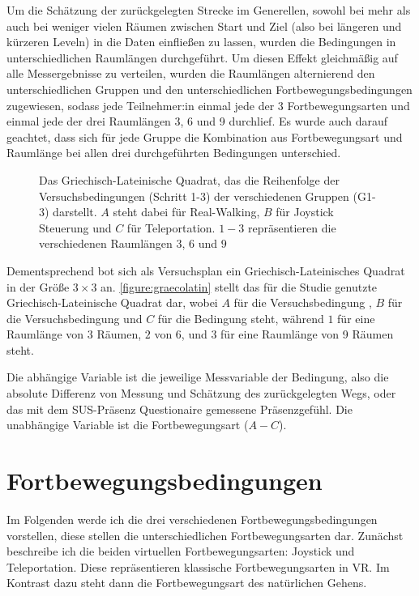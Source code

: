     Um die Schätzung der zurückgelegten Strecke im Generellen, sowohl bei mehr als auch bei weniger vielen Räumen zwischen Start und Ziel (also bei längeren und kürzeren Leveln) in die Daten einfließen zu lassen, wurden die Bedingungen in unterschiedlichen Raumlängen durchgeführt. Um diesen Effekt gleichmäßig auf alle Messergebnisse zu verteilen, wurden die Raumlängen alternierend den unterschiedlichen Gruppen und den unterschiedlichen Fortbewegungsbedingungen zugewiesen, sodass jede Teilnehmer:in einmal jede der 3 Fortbewegungsarten und einmal jede der drei Raumlängen 3, 6 und 9 durchlief. Es wurde auch darauf geachtet, dass sich für jede Gruppe die Kombination aus Fortbewegungsart und Raumlänge bei allen drei durchgeführten Bedingungen unterschied.

    \begin{figure}[!h]
        \centering
        

        \caption{Das Griechisch-Lateinische Quadrat, das die Reihenfolge der Versuchsbedingungen (Schritt 1-3) der verschiedenen Gruppen (G1-3) darstellt. $A$ steht dabei für Real-Walking, $B$ für Joystick Steuerung und $C$ für Teleportation. $1-3$ repräsentieren die verschiedenen Raumlängen $3$, $6$ und $9$}\label{figure:graecolatin}
    \end{figure}

    Dementsprechend bot sich als Versuchsplan ein Griechisch-Lateinisches Quadrat in der Größe $3 \times 3$ an. \autoref{figure:graecolatin} stellt das für die Studie genutzte Griechisch-Lateinische Quadrat dar, wobei $A$ für die Versuchsbedingung , $B$ für die Versuchsbedingung  und $C$ für die Bedingung  steht, während $1$ für eine Raumlänge von 3 Räumen, $2$ von 6, und $3$ für eine Raumlänge von 9 Räumen steht.

    Die abhängige Variable ist die jeweilige Messvariable der Bedingung, also die absolute Differenz von Messung und Schätzung des zurückgelegten Wegs, oder das mit dem SUS-Präsenz Questionaire gemessene Präsenzgefühl. Die unabhängige Variable ist die Fortbewegungsart ($A-C$).

    \section{Fortbewegungsbedingungen}\label{sec:conditions}
        Im Folgenden werde ich die drei verschiedenen Fortbewegungsbedingungen vorstellen, diese stellen die unterschiedlichen Fortbewegungsarten dar. Zunächst beschreibe ich die beiden virtuellen Fortbewegungsarten: Joystick und Teleportation. Diese repräsentieren klassische Fortbewegungsarten in VR. Im Kontrast dazu steht dann die Fortbewegungsart des natürlichen Gehens.

